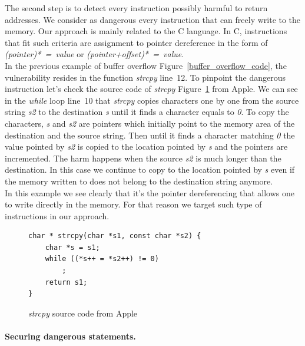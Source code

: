\documentclass[11pt]{sdm}
\begin{document}
The second step is to detect every instruction possibly harmful to return addresses. We consider as dangerous every instruction that can freely write to the memory. Our approach is mainly related to the C language.
In C, instructions that fit such criteria are assignment to pointer dereference in the form of  \textit{(pointer)*~=~value} or \textit{(pointer+offset)*~=~value}. \\
In the previous example of buffer overflow Figure~\ref{buffer_overflow_code}, the vulnerability resides in the function \textit{strcpy} line~12. To pinpoint the dangerous instruction let's check the source code of \textit{strcpy} Figure~\ref{strcpy} from Apple.
We can see in the \textit{while} loop line~10 that \textit{strcpy} copies characters one by one from the source string \textit{s2} to the destination \textit{s} until it finds a character equals to \textit{0}.
To copy the characters, \textit{s} and \textit{s2} are pointers which initially point to the memory area of the destination and the source string. Then until it finds a character matching \textit{0} the value pointed by \textit{s2} is copied to the location pointed by \textit{s} and the pointers are incremented. The harm happens when the source \textit{s2} is much longer than the destination. In this case we continue to copy to the location pointed by \textit{s} even if the memory written to does not belong to the destination string anymore.\\
In this example we see clearly that it's the pointer dereferencing that allows one to write directly in the memory. For that reason we target such type of instructions in our approach.

\begin{figure}[!ht]
\begin{lstlisting}
char * strcpy(char *s1, const char *s2) {
	char *s = s1;
	while ((*s++ = *s2++) != 0)
		;
	return s1;
}
\end{lstlisting}
\centering
\caption{\textit{strcpy} source code from Apple}
\label{strcpy}
\end{figure}

\paragraph{Securing dangerous statements.}
\label{par:Protection around dangerous statements}
\end{document}
